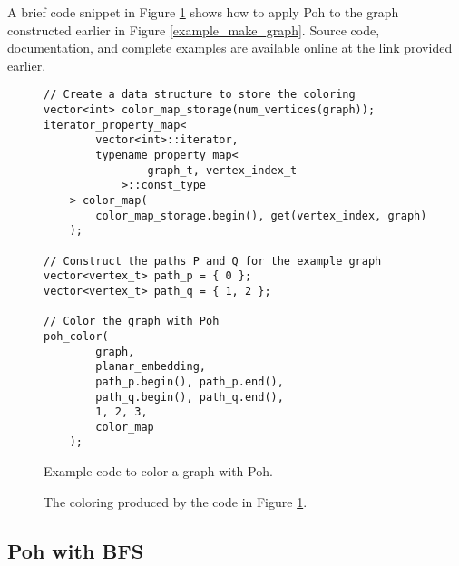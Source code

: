 \documentclass[letterpaper, 12pt]{article}
\theoremstyle{definition}
\theoremstyle{definition}
\theoremstyle{thm}
\theoremstyle{definition}
\begin{document}
A brief code snippet in Figure \ref{example_poh} shows how to apply Poh to the
graph constructed earlier in Figure \ref{example_make_graph}.
Source code, documentation, and complete examples are available online at the
link provided earlier.

\begin{figure}
\begin{lstlisting}[frame=single]
// Create a data structure to store the coloring
vector<int> color_map_storage(num_vertices(graph));
iterator_property_map<
        vector<int>::iterator,
        typename property_map<
                graph_t, vertex_index_t
            >::const_type
    > color_map(
        color_map_storage.begin(), get(vertex_index, graph)
    );

// Construct the paths P and Q for the example graph
vector<vertex_t> path_p = { 0 };
vector<vertex_t> path_q = { 1, 2 };

// Color the graph with Poh
poh_color(
        graph,
        planar_embedding,
        path_p.begin(), path_p.end(),
        path_q.begin(), path_q.end(),
        1, 2, 3,
        color_map
    );
\end{lstlisting}
\caption{Example code to color a graph with Poh.}
\label{example_poh}
\end{figure}

\begin{figure}
\begin{center}
\end{center}
\caption{The coloring produced by the code in Figure \ref{example_poh}.}
\end{figure}

\subsection{Poh with BFS}
\end{document}
